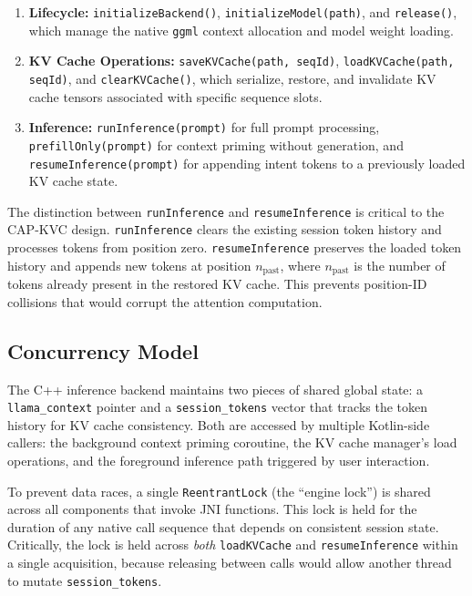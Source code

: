 \begin{enumerate}
    \item \textbf{Lifecycle:} \texttt{initializeBackend()}, \texttt{initializeModel(path)}, and \texttt{release()}, which manage the native \texttt{ggml} context allocation and model weight loading.

    \item \textbf{KV Cache Operations:} \texttt{saveKVCache(path, seqId)}, \texttt{loadKVCache(path, seqId)}, and \texttt{clearKVCache()}, which serialize, restore, and invalidate KV cache tensors associated with specific sequence slots.

    \item \textbf{Inference:} \texttt{runInference(prompt)} for full prompt processing, \texttt{prefillOnly(prompt)} for context priming without generation, and \texttt{resumeInference(prompt)} for appending intent tokens to a previously loaded KV cache state.
\end{enumerate}

The distinction between \texttt{runInference} and \texttt{resumeInference} is critical to the CAP-KVC design. \texttt{runInference} clears the existing session token history and processes tokens from position zero. \texttt{resumeInference} preserves the loaded token history and appends new tokens at position $n_{\text{past}}$, where $n_{\text{past}}$ is the number of tokens already present in the restored KV cache. This prevents position-ID collisions that would corrupt the attention computation.

\subsection{Concurrency Model}
\label{sec:concurrency}

The C++ inference backend maintains two pieces of shared global state: a \texttt{llama\_context} pointer and a \texttt{session\_tokens} vector that tracks the token history for KV cache consistency. Both are accessed by multiple Kotlin-side callers: the background context priming coroutine, the KV cache manager's load operations, and the foreground inference path triggered by user interaction.

To prevent data races, a single \texttt{ReentrantLock} (the ``engine lock'') is shared across all components that invoke JNI functions. This lock is held for the duration of any native call sequence that depends on consistent session state. Critically, the lock is held across \emph{both} \texttt{loadKVCache} and \texttt{resumeInference} within a single acquisition, because releasing between calls would allow another thread to mutate \texttt{session\_tokens}.

